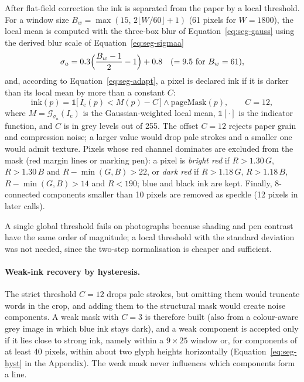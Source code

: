 After flat-field correction the ink is separated from the paper by a local threshold.
For a window size $B_w=\max(15,\,2\lfloor W/60\rfloor+1)$ (61 pixels for $W=1800$), the local mean is computed with the three-box blur of Equation~\ref{eq:seg-gauss} using the derived blur scale of Equation~\ref{eq:seg-sigmaa}
\begin{equation}
\sigma_a=0.3\Bigl(\frac{B_w-1}{2}-1\Bigr)+0.8\quad(=9.5\ \text{for}\ B_w=61),
\label{eq:seg-sigmaa}
\end{equation}
and, according to Equation~\ref{eq:seg-adapt}, a pixel is declared ink if it is darker than its local mean by more than a constant $C$:
\begin{equation}
\mathrm{ink}(p)=\mathbb 1\bigl[\,I_{\mathrm c}(p)<M(p)-C\,\bigr]\wedge\mathrm{pageMask}(p),\qquad C=12,
\label{eq:seg-adapt}
\end{equation}
where $M=\mathcal G_{\sigma_a}(I_{\mathrm c})$ is the Gaussian-weighted local mean, $\mathbb 1[\cdot]$ is the indicator function, and $C$ is in grey levels out of 255.
The offset $C=12$ rejects paper grain and compression noise; a larger value would drop pale strokes and a smaller one would admit texture.
Pixels whose red channel dominates are excluded from the mask (red margin lines or marking pen): a pixel is \emph{bright red} if $R>1.30\,G$, $R>1.30\,B$ and $R-\min(G,B)>22$, or \emph{dark red} if $R>1.18\,G$, $R>1.18\,B$, $R-\min(G,B)>14$ and $R<190$; blue and black ink are kept.
Finally, 8-connected components smaller than 10 pixels are removed as speckle (12 pixels in later calls).

A single global threshold fails on photographs because shading and pen contrast have the same order of magnitude; a local threshold with the standard deviation \cite{sauvola2000} was not needed, since the two-step normalisation is cheaper and sufficient.

\paragraph{Weak-ink recovery by hysteresis.}
The strict threshold $C=12$ drops pale strokes, but omitting them would truncate words in the crop, and adding them to the structural mask would create noise components.
A weak mask with $C=3$ is therefore built (also from a colour-aware grey image in which blue ink stays dark), and a weak component is accepted only if it lies close to strong ink, namely within a $9\times25$ window or, for components of at least 40 pixels, within about two glyph heights horizontally (Equation~\ref{eq:seg-hyst} in the Appendix).
The weak mask never influences which components form a line.

